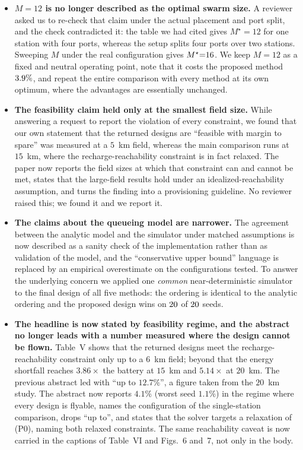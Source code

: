 \documentclass[11pt]{article}
\begin{document}
\begin{itemize}
\item \textbf{$M{=}12$ is no longer described as the optimal swarm size.} A reviewer
asked us to re-check that claim under the actual placement and port split, and the
check contradicted it: the table we had cited gives $M^\star{=}12$ for one station with
four ports, whereas the setup splits four ports over two stations. Sweeping $M$ under
the real configuration gives $M^\star{=}16$. We keep $M{=}12$ as a fixed and
neutral operating point, note that it costs the proposed method $3.9\%$,
and repeat the entire comparison with every method at its own optimum, where the
advantages are essentially unchanged.

\item \textbf{The feasibility claim held only at the smallest field size.} While
answering a request to report the violation of every constraint, we found that our own
statement that the returned designs are ``feasible with margin to spare'' was measured
at a $5$~km field, whereas the main comparison runs at $15$~km, where the
recharge-reachability constraint is in fact relaxed. The paper now reports the field
sizes at which that constraint can and cannot be met, states that the large-field
results hold under an idealized-reachability assumption, and turns the finding into a
provisioning guideline. No reviewer raised this; we found it and we report it.

\item \textbf{The claims about the queueing model are narrower.} The agreement between
the analytic model and the simulator under matched assumptions is now described as a
sanity check of the implementation rather than as validation of the model, and the
``conservative upper bound'' language is replaced by an empirical overestimate on the
configurations tested. To answer the underlying concern we applied one \emph{common}
near-deterministic simulator to the final design of all five methods: the ordering is
identical to the analytic ordering and the proposed design wins on $20$ of
$20$ seeds.
\item \textbf{The headline is now stated by feasibility regime, and the abstract no
longer leads with a number measured where the design cannot be flown.} Table~V shows that
the returned designs meet the recharge-reachability constraint only up to a $6$~km field;
beyond that the energy shortfall reaches $3.86\times$ the battery at $15$~km and
$5.14\times$ at $20$~km. The previous abstract led with ``up to $12.7\%$'', a figure taken
from the $20$~km study. The abstract now reports $4.1\%$ (worst seed $1.1\%$) in the
regime where every design is flyable, names the configuration of the single-station
comparison, drops ``up to'', and states that the solver targets a relaxation of (P0),
naming both relaxed constraints. The same reachability caveat is now carried in the
captions of Table~VI and Figs.~6 and~7, not only in the body.


\end{itemize}
\end{document}
